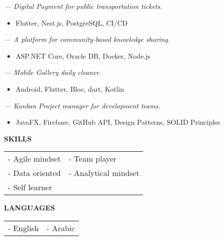 

 \textit{\small— Digital Payment for public transportation tickets.}
\smallskip
\begin{itemize}
	\item Flutter, Nest.js, PostgreSQL, CI/CD
\end{itemize}

\smallskip

\smallskip
{} \textit{\small— A platform for community-based knowledge sharing.}
\smallskip
\begin{itemize}
	\item ASP.NET Core, Oracle DB, Docker, Node.js
\end{itemize}

\medskip
{} \textit{\small— Mobile Gallery daily cleaner.}
\smallskip
\begin{itemize}
	\item Android, Flutter, Bloc, dart, Kotlin
\end{itemize}

\medskip
{} \textit{\small — Kanban Project manager for development teams.}
\smallskip
\begin{itemize}
	\item JavaFX, Firebase, GitHub API, Design Patterns, SOLID Principles
\end{itemize}


\textcolor{VividPurple}{\textbf{SKILLS}}
\medskip

\begin{tabular}{ l l } 
	- Agile mindset & - Team player         \\
	- Data oriented & - Analytical mindset  \\
    - Self learner                          \\
\end{tabular}

\medskip
\divider

\textcolor{VividPurple}{\textbf{LANGUAGES}}
\medskip

\begin{tabular}{ l l } 
	- English & - Arabic \\
\end{tabular}  

